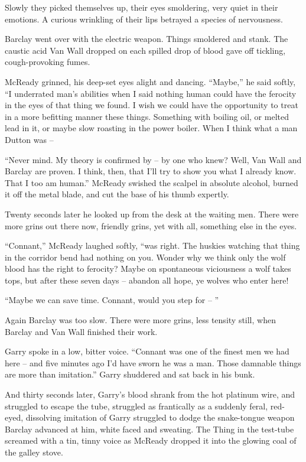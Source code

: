 \documentclass[letterpaper,openany,12pt]{memoir}		%
\begin{document}
Slowly they picked themselves up, their eyes smoldering, very quiet in their
emotions. A curious wrinkling of their lips betrayed a species of nervousness.

Barclay went over with the electric weapon. Things smoldered and stank. The
caustic acid Van Wall dropped on each spilled drop of blood gave off tickling,
cough-provoking fumes.

McReady grinned, his deep-set eyes alight and dancing. ``Maybe,'' he said
softly, ``I underrated man's abilities when I said nothing human could have the
ferocity in the eyes of that thing we found. I wish we could have the
opportunity to treat in a more befitting manner these things. Something with
boiling oil, or melted lead in it, or maybe slow roasting in the power boiler.
When I think what a man Dutton was --

``Never mind. My theory is confirmed by -- by one who knew? Well, Van Wall and
Barclay are proven. I think, then, that I'll try to show you what I already
know. That I too am human.'' McReady swished the scalpel in absolute alcohol,
burned it off the metal blade, and cut the base of his thumb expertly.

Twenty seconds later he looked up from the desk at the waiting men. There were
more grins out there now, friendly grins, yet with all, something else in the
eyes.

``Connant,'' McReady laughed softly, ``was right. The huskies watching that
thing in the corridor bend had nothing on you. Wonder why we think only the wolf
blood has the right to ferocity? Maybe on spontaneous viciousness a wolf takes
tops, but after these seven days -- abandon all hope, ye wolves who enter here!

``Maybe we can save time. Connant, would you step for -- ''

Again Barclay was too slow. There were more grins, less tensity still, when
Barclay and Van Wall finished their work.

Garry spoke in a low, bitter voice. ``Connant was one of the finest men we had
here -- and five minutes ago I'd have sworn he was a man. Those damnable things
are more than imitation.'' Garry shuddered and sat back in his bunk.

And thirty seconds later, Garry's blood shrank from the hot platinum wire, and
struggled to escape the tube, struggled as frantically as a suddenly feral,
red-eyed, dissolving imitation of Garry struggled to dodge the snake-tongue
weapon Barclay advanced at him, white faced and sweating. The Thing in the
test-tube screamed with a tin, tinny voice as McReady dropped it into the
glowing coal of the galley stove.
\end{document}
